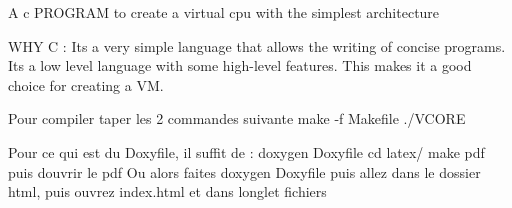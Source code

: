 A c PROGRAM to create a virtual cpu with the simplest architecture

WHY C \+: It\textquotesingle{}s a very simple language that allows the writing of concise programs. It\textquotesingle{}s a low level language with some high-\/level features. This makes it a good choice for creating a VM.

Pour compiler taper les 2 commandes suivante make -\/f Makefile ./\+VCORE

Pour ce qui est du Doxyfile, il suffit de \+: doxygen Doxyfile cd latex/ make pdf puis d\textquotesingle{}ouvrir le pdf Ou alors faites doxygen Doxyfile puis allez dans le dossier html, puis ouvrez index.\+html et dans l\textquotesingle{}onglet fichiers 